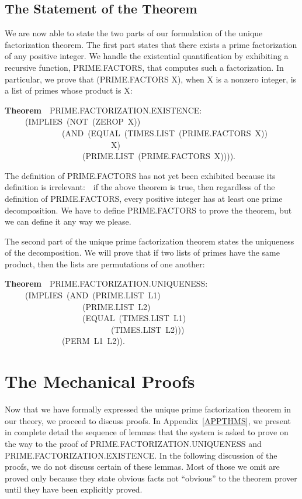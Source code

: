 \documentclass[10pt]{book}
\newenvironment{pubasis}{\begin{flushleft}}{\end{flushleft}}
\newcommand{\axiomordefinition}[1]{\vspace{6pt}\Large\textsf{\textbf{#1}}\normalsize}
\begin{document}
\subsection{The Statement of the Theorem}
We are now able to state the two parts of our formulation
of the unique factorization theorem.  The first part
states that there exists a prime factorization of
any positive integer.  We handle the existential quantification by
exhibiting a recursive function, PRIME.FACTORS, that
computes such a factorization.  In particular, we
prove that (PRIME.FACTORS X), when X is a nonzero integer, is a
list of primes whose product is X:

\begin{pubasis}
\axiomordefinition{Theorem}~~PRIME.FACTORIZATION.EXISTENCE:\\
~~~~~(IMPLIES~(NOT~(ZEROP~X))\\
~~~~~~~~~~~~~~(AND~(EQUAL~(TIMES.LIST~(PRIME.FACTORS~X))\\
~~~~~~~~~~~~~~~~~~~~~~~~~~X)\\
~~~~~~~~~~~~~~~~~~~(PRIME.LIST~(PRIME.FACTORS~X)))).\\
\end{pubasis}
The definition of PRIME.FACTORS has not yet been exhibited
because its definition is irrelevant:~~if the above theorem is
true, then regardless of the definition of PRIME.FACTORS, 
every positive integer has at least one prime decomposition.
We  have to define PRIME.FACTORS to prove the theorem, but we
can define it any way we please.

The second part of the unique prime factorization theorem states the
uniqueness of the decomposition.  We will prove that
if two lists of primes have the same product, then the lists
are permutations of one another:
\begin{pubasis}
\axiomordefinition{Theorem}~~PRIME.FACTORIZATION.UNIQUENESS:\\
~~~~~(IMPLIES~(AND~(PRIME.LIST~L1)\\
~~~~~~~~~~~~~~~~~~~(PRIME.LIST~L2)\\
~~~~~~~~~~~~~~~~~~~(EQUAL~(TIMES.LIST~L1)\\
~~~~~~~~~~~~~~~~~~~~~~~~~~(TIMES.LIST~L2)))\\
~~~~~~~~~~~~~~(PERM~L1~L2)).\\
\end{pubasis}
\section{The Mechanical Proofs}
\label{MECHPROOFS}
Now that we have formally expressed the
unique prime factorization theorem in our theory,
we proceed to discuss proofs.  In Appendix~\ref{APPTHMS}, we
present in complete detail the sequence of lemmas
that the system is asked to prove on the way
to the proof of PRIME.FACTORIZATION.UNIQUENESS and
PRIME.FACTORIZATION.EXISTENCE.  In the following discussion
of the proofs, we do not discuss certain
of these lemmas.  Most of those we omit are proved
only because they state obvious facts not
``obvious'' to the theorem prover until they
have been explicitly proved.
\end{document}
